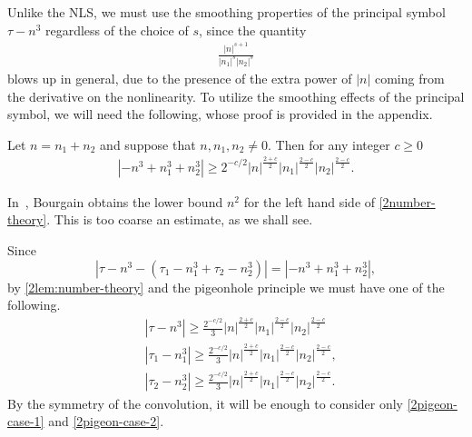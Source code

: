 %
%
Unlike the NLS, we must use the smoothing properties of the
principal symbol $\tau - n^3$ regardless of the choice of $s$, since the quantity
%
%
\begin{equation}
	\label{2convo-multiplier}
	\begin{split}
		\frac{|n|^{s+1}}{|n_1|^s |n_2|^s }
	\end{split}
\end{equation}
%
%
blows up in general, due to the presence of the extra power of $|n|$ coming from the derivative on
the nonlinearity. To utilize the smoothing effects of the principal symbol, we will need the following, whose
proof is provided in the appendix.
%
%
\begin{lemma}
	\label{2lem:number-theory}
	Let $n=n_1 + n_2$ and suppose that $n, n_1, n_2\neq
	0$. Then for any integer $c \ge 0$
%
%
\begin{equation}
	\begin{split}
		\label{2number-theory}
		| - n^{3} + n_1^3 + n_2^3| \ge 2^{-c/2} | n |^{\frac{2+c}{2}} | n_{1}
		|^{\frac{2-c}{2}}| n_2 |^{\frac{2-c}{2}}.
	\end{split}
\end{equation}
%
%
\end{lemma}
%
%
\begin{remark}
	In~\cite{Bourgain:1993ju}, Bourgain obtains the lower bound $n^2$ for
	the left hand side of \eqref{2number-theory}. This is too coarse an estimate,
	as we shall see.
\end{remark}
%
%
Since $$| \tau - n^{3} - \left( \tau_1 - n_1^3 
+ \tau_2 - n_2^3  \right ) | = | - n^{3} + n_1^3 +
n_2^3|,$$ by \cref{2lem:number-theory} and
the pigeonhole principle we must have one of the 
following.
%
%
\begin{align}
	\label{2pigeon-case-1}
	& |\tau - n^3| \ge \frac{2^{-c/2}}{3} | n |^{\frac{2+c}{2}} | n_{1}
		|^{\frac{2-c}{2}}| n_2 |^{\frac{2-c}{2}}		\\
		\label{2pigeon-case-2}
		& | \tau_1 - n_1^3 | \ge \frac{2^{-c/2}}{3} | n |^{\frac{2+c}{2}} | n_{1}
		|^{\frac{2-c}{2}}| n_2 |^{\frac{2-c}{2}},  
		\\
		\label{2pigeon-case-3}
		& | \tau_2 - n_2^3 | \ge
		\frac{2^{-c/2}}{3} | n |^{\frac{2+c}{2}} | n_{1}
		|^{\frac{2-c}{2}}| n_2 |^{\frac{2-c}{2}}.  
\end{align}
%
%
By the symmetry of the convolution, it will be enough to consider only
\eqref{2pigeon-case-1} and \eqref{2pigeon-case-2}.
%
%
%
